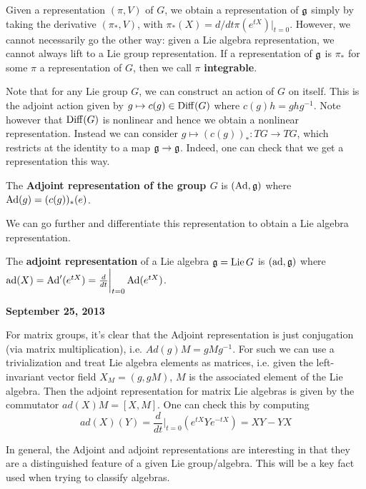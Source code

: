 \documentclass{../mathnotes}
\begin{document}
\begin{rem}
    Given a representation $(\pi, V)$ of $G$, we obtain a representation of $\mathfrak g$ simply by taking the derivative $(\pi_*,V)$,
    with $\pi_*(X)=d/dt\pi(e^{tX})|_{t=0}$. However, we cannot necessarily go the other way: given a Lie algebra representation, we cannot
    always lift to a Lie group representation. If a representation of $\mathfrak g$ is $\pi_*$ for some $\pi$ a representation of $G$, then we call
    $\pi$ \textbf{integrable}.
\end{rem}

Note that for any Lie group $G$, we can construct an action of $G$ on itself. This is the adjoint action given by $g\mapsto c(g)\in\operatorname{Diff}(G)$ where
$c(g)h=ghg^{-1}$. Note however that $\operatorname{Diff}(G)$ is nonlinear and hence we obtain a nonlinear representation. Instead we can consider
$g\mapsto (c(g))_*: TG\to TG$, which restricts at the identity to a map $\mathfrak g\to\mathfrak g$. Indeed, one can check that we get a representation this way.

\begin{defn}
    The \textbf{Adjoint representation of the group $G$} is $(\operatorname{Ad},\mathfrak g)$ where $\operatorname{Ad}(g)=(c(g))_*(e)$.
\end{defn}

We can go further and differentiate this representation to obtain a Lie algebra representation.

\begin{defn}
    The \textbf{adjoint representation} of a Lie algebra $\mathfrak g=\operatorname{Lie} G$ is $(\operatorname{ad}, \mathfrak g)$ where $\operatorname{ad}(X)=\operatorname{Ad}'(e^{tX})=\frac{d}{dt}\bigg|_{t=0}\operatorname{Ad}(e^{tX})$.
\end{defn}

\textbf{September 25, 2013}

For matrix groups, it's clear that the Adjoint representation is just conjugation (via matrix multiplication), i.e. $Ad(g)M=gMg^{-1}$.
For such we can use a trivialization and treat Lie algebra elements as matrices, i.e. given the left-invariant vector field $X_M=(g,gM)$,
$M$ is the associated element of the Lie algebra.
Then the adjoint representation for matrix Lie algebras is given by the commutator $ad(X)M=[X,M]$. One can check this by computing
\[ad(X)(Y)=\frac{d}{dt}\bigg|_{t=0}\left( e^{tX}Ye^{-tX} \right)=XY-YX\]

In general, the Adjoint and adjoint representations are interesting in that they are a distinguished feature of a given Lie group/algebra.
This will be a key fact used when trying to classify algebras.
\end{document}
